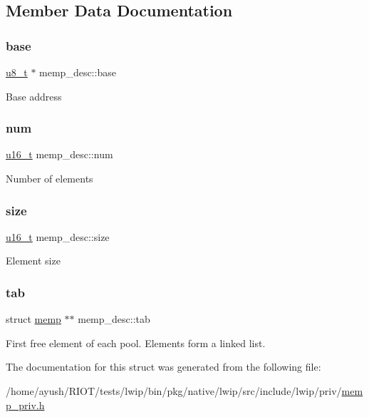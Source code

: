 \subsection{Member Data Documentation}
\mbox{\label{structmemp__desc_a2201cfaa51bc8f0b567d6d46cf177624}} 
\subsubsection{\texorpdfstring{base}{base}}
{\footnotesize\ttfamily \hyperlink{group__compiler__abstraction_ga4caecabca98b43919dd11be1c0d4cd8e}{u8\+\_\+t} $\ast$ memp\+\_\+desc\+::base}

Base address \mbox{\label{structmemp__desc_a2c32db78e565b8812ca0e20fe929a8a7}} 
\subsubsection{\texorpdfstring{num}{num}}
{\footnotesize\ttfamily \hyperlink{group__compiler__abstraction_ga77570ac4fcab86864fa1916e55676da2}{u16\+\_\+t} memp\+\_\+desc\+::num}

Number of elements \mbox{\label{structmemp__desc_a1688d2bdd5a7b77700e1fa627f025ba3}} 
\subsubsection{\texorpdfstring{size}{size}}
{\footnotesize\ttfamily \hyperlink{group__compiler__abstraction_ga77570ac4fcab86864fa1916e55676da2}{u16\+\_\+t} memp\+\_\+desc\+::size}

Element size \mbox{\label{structmemp__desc_a98a1016a663a74dd98e65daf84782399}} 
\subsubsection{\texorpdfstring{tab}{tab}}
{\footnotesize\ttfamily struct \hyperlink{structmemp}{memp} $\ast$$\ast$ memp\+\_\+desc\+::tab}

First free element of each pool. Elements form a linked list. 

The documentation for this struct was generated from the following file\+:\begin{DoxyCompactItemize}
\item 
/home/ayush/\+R\+I\+O\+T/tests/lwip/bin/pkg/native/lwip/src/include/lwip/priv/\hyperlink{native_2lwip_2src_2include_2lwip_2priv_2memp__priv_8h}{memp\+\_\+priv.\+h}\end{DoxyCompactItemize}
